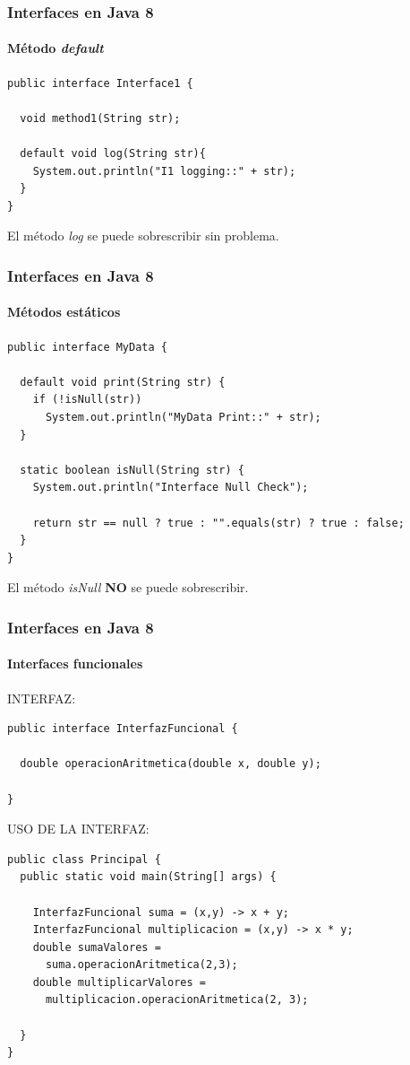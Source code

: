 \documentclass{beamer}
\begin{document}
\begin{frame}[fragile]
\frametitle{Interfaces en Java 8}
\framesubtitle{Método \emph{default}}
\begin{verbatim}
public interface Interface1 {

  void method1(String str);
	
  default void log(String str){
    System.out.println("I1 logging::" + str);
  }
}
\end{verbatim}
\pause
El método \emph{log} se puede sobrescribir sin problema.
\end{frame}

\begin{frame}[fragile]
\frametitle{Interfaces en Java 8}
\framesubtitle{Métodos estáticos}
\begin{small}
\begin{verbatim}
public interface MyData {

  default void print(String str) {
    if (!isNull(str))
      System.out.println("MyData Print::" + str);
  }

  static boolean isNull(String str) {
    System.out.println("Interface Null Check");

    return str == null ? true : "".equals(str) ? true : false;
  }
}
\end{verbatim}
\end{small}
\pause
El método \emph{isNull} \textbf{NO} se puede sobrescribir.
\end{frame}

\begin{frame}[fragile]
\frametitle{Interfaces en Java 8}
\framesubtitle{Interfaces funcionales}
\begin{footnotesize}

INTERFAZ:
\begin{verbatim}
public interface InterfazFuncional {
	
  double operacionAritmetica(double x, double y);

}

\end{verbatim}
USO DE LA INTERFAZ:
\begin{verbatim}
public class Principal {
  public static void main(String[] args) {
		
    InterfazFuncional suma = (x,y) -> x + y;
    InterfazFuncional multiplicacion = (x,y) -> x * y;
    double sumaValores = 
      suma.operacionAritmetica(2,3);
    double multiplicarValores = 
      multiplicacion.operacionAritmetica(2, 3);
		
  }
}
\end{verbatim}

\end{footnotesize}
\end{frame}
\end{document}
